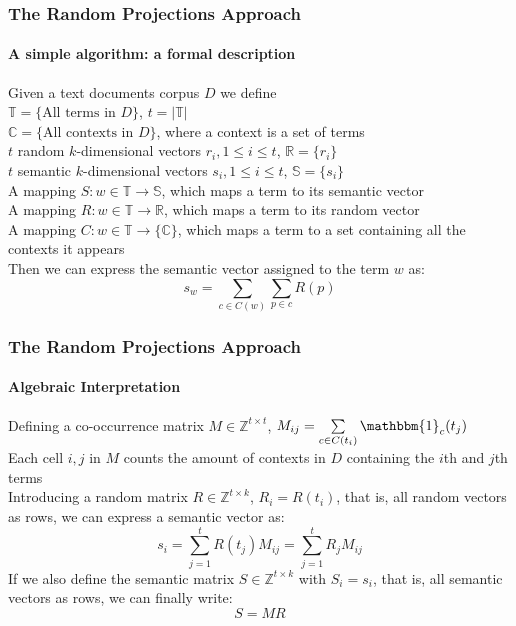 \documentclass{beamer}
\begin{document}
\begin{frame}
	\frametitle{The Random Projections Approach}
	\framesubtitle{A simple algorithm: a formal description}

Given a text documents corpus $D$ we define \\
$\mathbb{T}=\{\text{All terms in } D\}$, $t =  \left\vert{\mathbb{T}}\right\vert$ \\
$\mathbb{C} = \{\text{All contexts in } D\}$, where a context is a set of terms \\
$t$ random $k$-dimensional vectors $r_i, 1\leq i\leq t$,  $\mathbb{R} = \{r_i\}$ \\
$t$ semantic $k$-dimensional vectors $s_i, 1\leq i\leq t$,  $\mathbb{S} = \{s_i\}$ \\
A mapping $S:w \in \mathbb{T} \rightarrow  \mathbb{S}$, which maps a term to its semantic vector \\
A mapping $R:w \in \mathbb{T} \rightarrow  \mathbb{R}$, which maps a term to its random vector \\
A mapping $C:w \in \mathbb{T} \rightarrow  \{\mathbb{C}\}$, which maps a term to a set containing all the contexts it appears \\
Then we can express the semantic vector assigned to the term $w$ as: \\
\begin{equation}
s_w =\sum\limits_{c \in C(w)} \sum\limits_{p \in c} R(p)
\end{equation}
\end{frame}


\begin{frame}
  	\frametitle{The Random Projections Approach}
  	\framesubtitle{Algebraic Interpretation}
  	
Defining a co-occurrence matrix $M \in \mathbb{Z}^{t \times t} $, $M_{ij} = \sum\limits_{c \in C(t_i)} \mathbbm{1}_c (t_j)$ \\
Each cell $i, j$ in $M$ counts the amount of contexts in $D$ containing the $i$th and $j$th terms\\
Introducing a random matrix $R \in \mathbb{Z}^{t \times k} $,  $R_i = R(t_i)$, that is, all random vectors as rows, we can express a semantic vector as:\\
\begin{equation}
s_i =\sum\limits_{j=1}^{t} R(t_j)M_{ij} =\sum\limits_{j=1}^{t} R_jM_{ij}
\end{equation}
If we also define the semantic matrix $S \in \mathbb{Z}^{t \times k} $ with $S_i = s_i$, that is, all semantic vectors as rows, we can finally write:\\
\begin{equation}
S=MR
\end{equation}
\end{frame}
\end{document}
